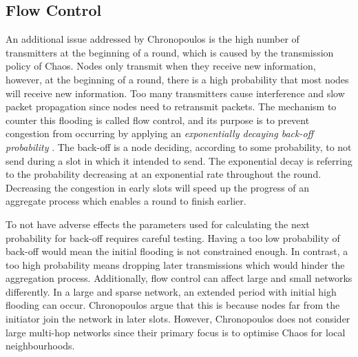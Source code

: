 \subsection{Flow Control}
An additional issue addressed by Chronopoulos is the high number of transmitters at the beginning of a round, which is caused by the transmission policy of Chaos. Nodes only transmit when they receive new information, however, at the beginning of a round, there is a high probability that most nodes will receive new information. Too many transmitters cause interference and slow packet propagation since nodes need to retransmit packets. The mechanism to counter this flooding is called flow control, and its purpose is to prevent congestion from occurring by applying an \textit{exponentially decaying back-off probability} \cite{Chronopoulos2016-extreme-chaos}. The back-off is a node deciding, according to some probability, to not send during a slot in which it intended to send. The exponential decay is referring to the probability decreasing at an exponential rate throughout the round. Decreasing the congestion in early slots will speed up the progress of an aggregate process which enables a round to finish earlier.

To not have adverse effects the parameters used for calculating the next probability for back-off requires careful testing. Having a too low probability of back-off would mean the initial flooding is not constrained enough. In contrast, a too high probability means dropping later transmissions which would hinder the aggregation process. Additionally, flow control can affect large and small networks differently. In a large and sparse network, an extended period with initial high flooding can occur. Chronopoulos argue that this is because nodes far from the initiator join the network in later slots. However, Chronopoulos does not consider large multi-hop networks since their primary focus is to optimise Chaos for local neighbourhoods.

